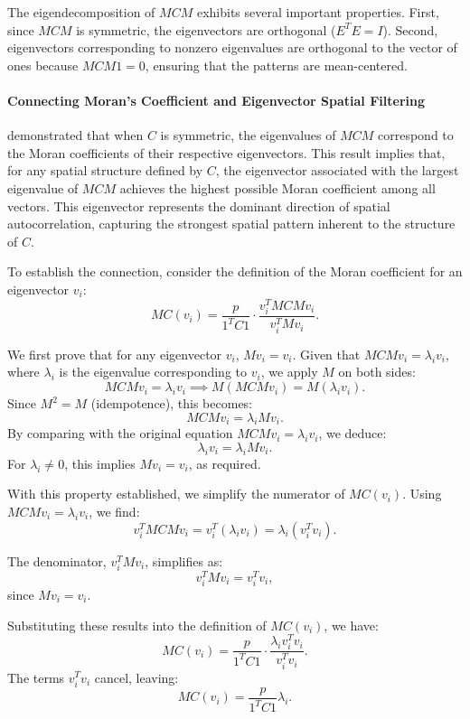 \documentclass[12pt]{article}
\begin{document}
The eigendecomposition of \( M C M \) exhibits several important properties. First, since \( MCM \) is symmetric, the eigenvectors are orthogonal (\( E^T E = I \)). Second, eigenvectors corresponding to nonzero eigenvalues are orthogonal to the vector of ones because \( MCM 1 = 0 \), ensuring that the patterns are mean-centered.


\paragraph{Connecting Moran's Coefficient and Eigenvector Spatial Filtering}

\citet{de1984extreme} demonstrated that when \( C \) is symmetric, the eigenvalues of \( MCM \) correspond to the Moran coefficients of their respective eigenvectors. This result implies that, for any spatial structure defined by \( C \), the eigenvector associated with the largest eigenvalue of \( MCM \) achieves the highest possible Moran coefficient among all vectors. This eigenvector represents the dominant direction of spatial autocorrelation, capturing the strongest spatial pattern inherent to the structure of \( C \).

To establish the connection, consider the definition of the Moran coefficient for an eigenvector \( v_i \):
\[
	MC(v_i) = \frac{p}{1^T C 1} \cdot \frac{v_i^T MCM v_i}{v_i^T M v_i}.
\]

We first prove that for any eigenvector \( v_i \), \( M v_i = v_i \). Given that \( MCM v_i = \lambda_i v_i \), where \( \lambda_i \) is the eigenvalue corresponding to \( v_i \), we apply \( M \) on both sides:
\[
	MCM v_i = \lambda_i v_i \implies M(MCM v_i) = M(\lambda_i v_i).
\]
Since \( M^2 = M \) (idempotence), this becomes:
\[
	MCM v_i = \lambda_i M v_i.
\]
By comparing with the original equation \( MCM v_i = \lambda_i v_i \), we deduce:
\[
	\lambda_i v_i = \lambda_i M v_i.
\]
For \( \lambda_i \neq 0 \), this implies \( M v_i = v_i \), as required.

With this property established, we simplify the numerator of \( MC(v_i) \). Using \( MCM v_i = \lambda_i v_i \), we find:
\[
	v_i^T MCM v_i = v_i^T (\lambda_i v_i) = \lambda_i (v_i^T v_i).
\]

The denominator, \( v_i^T M v_i \), simplifies as:
\[
	v_i^T M v_i = v_i^T v_i,
\]
since \( M v_i = v_i \).

Substituting these results into the definition of \( MC(v_i) \), we have:
\[
	MC(v_i) = \frac{p}{1^T C 1} \cdot \frac{\lambda_i v_i^T v_i}{v_i^T v_i}.
\]
The terms \( v_i^T v_i \) cancel, leaving:
\[
	MC(v_i) = \frac{p}{1^T C 1} \lambda_i.
\]
\end{document}
